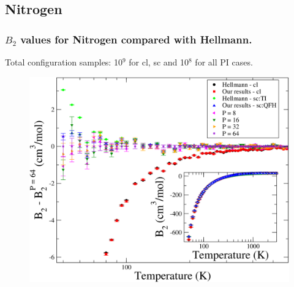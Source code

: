 \documentclass[xcolor=svgnames]{beamer}
\begin{document}
        \subsection{Nitrogen}
            \begin{frame}
                \frametitle{$B_2$ values for Nitrogen compared with Hellmann.}
                \begin{center}Total configuration samples: 10$^9$ for cl, sc and 10$^8$ for all PI cases.\end{center}
                \begin{figure}[!htbp]
                    \centering
                    \includegraphics[scale=0.15,keepaspectratio]{B2AllDiffPICB.png}
                \end{figure}
            \end{frame}
\end{document}
